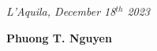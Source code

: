 \documentclass[a4paper,9pt]{article} %
\begin{document}
\begin{thebibliography}{100}
\emph{L'Aquila, December 18$^{th}$ 2023}


\textbf{Phuong T. Nguyen}
		
\end{thebibliography}
\end{document}
